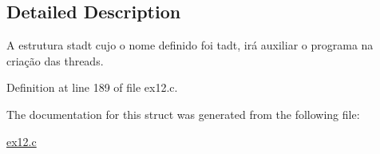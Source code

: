 \subsection{Detailed Description}

\begin{DoxyItemize}
\item A estrutura stadt cujo o nome definido foi tadt, irá auxiliar o programa na criação das threads. 
\end{DoxyItemize}

Definition at line 189 of file ex12.\+c.



The documentation for this struct was generated from the following file\+:\begin{DoxyCompactItemize}
\item 
\hyperlink{ex12_8c}{ex12.\+c}\end{DoxyCompactItemize}
